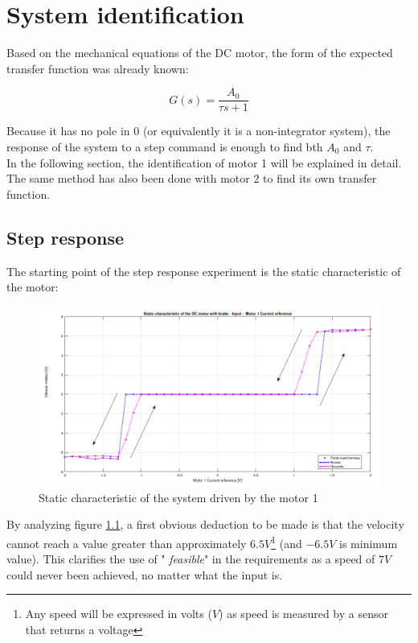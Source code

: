 \setcounter{secnumdepth}{2}

\chapter{System identification}

Based on the mechanical equations of the DC motor, the form of the expected transfer function was already known:

\begin{equation}
    G(s) = \frac{A_0}{\tau s + 1}
    \label{1_st_order_TF}
\end{equation}

Because it has no pole in $0$ (or equivalently it is a non-integrator system), the response of the system to a step
command is enough to find bth $A_0$ and $\tau$.\\

In the following section, the identification of motor 1 will be explained in detail. The same method has also been 
done with motor 2 to find its own transfer function.

\section{Step response}

The starting point of the step response experiment is the static characteristic of the motor:

\begin{figure}[H]
    \centering
    \includegraphics[height=\textheight/4]{Pictures/static_characteristic_motor_1.png}
    \caption{Static characteristic of the system driven by the motor 1}
    \label{static_characteristic_motor_1}
\end{figure}

By analyzing figure \ref{static_characteristic_motor_1}, a first obvious deduction to be made is that the velocity
cannot reach a value greater than approximately $6.5 V$\footnote{Any speed will be expressed in volts ($V$) as speed is
measured by a sensor that returns a voltage} (and $-6.5 V$ is minimum value). This clarifies the use of "\textit{
feasible}" in the requirements as a speed of $7 V$ could never been achieved, no matter what the input is.\\

